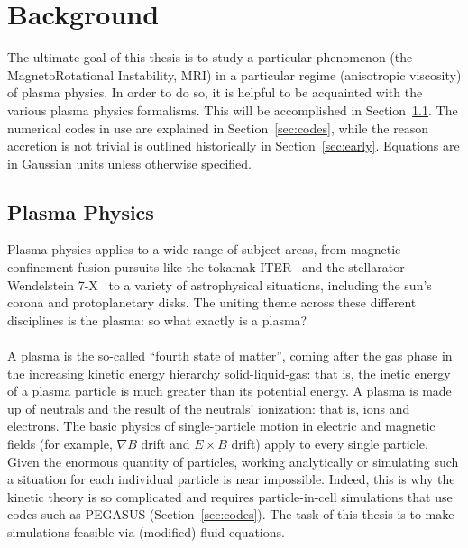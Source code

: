 \chapter{Background}\label{chap:background}
The ultimate goal of this thesis is to study a particular phenomenon (the MagnetoRotational Instability, MRI) in a particular regime (anisotropic viscosity) of plasma physics. In order to do so, it is helpful to be acquainted with the various plasma physics formalisms. This will be accomplished in Section~\ref{sec:plasmaphysics}. The numerical codes in use are explained in Section~\ref{sec:codes}, while the reason accretion is not trivial is outlined historically in Section~\ref{sec:early}. Equations are in Gaussian units unless otherwise specified. 



\section{Plasma Physics} \label{sec:plasmaphysics}
Plasma physics applies to a wide range of subject areas, from magnetic-confinement fusion pursuits like the tokamak ITER~\cite{Janeschitz2001} and the stellarator Wendelstein 7-X~\cite{Grieger1993} to a variety of astrophysical situations, including the sun's corona and protoplanetary disks. The uniting theme across these different disciplines is the plasma: so what exactly is a plasma? \\
\\
A plasma is the so-called ``fourth state of matter'', coming after the gas phase in the increasing kinetic energy hierarchy solid-liquid-gas: that is, the inetic energy of a plasma particle is much greater than its potential energy. A plasma is made up of neutrals and the result of the neutrals' ionization: that is, ions and electrons. The basic physics of single-particle motion in electric and magnetic fields (for example, $\nabla B$ drift and $E\times B$ drift) apply to every single particle. Given the enormous quantity of particles, working analytically or simulating such a situation for each individual particle is near impossible. Indeed, this is why the kinetic theory is so complicated and requires particle-in-cell simulations that use codes such as PEGASUS (Section~\ref{sec:codes}). The task of this thesis is to make simulations feasible via (modified) fluid equations. 

